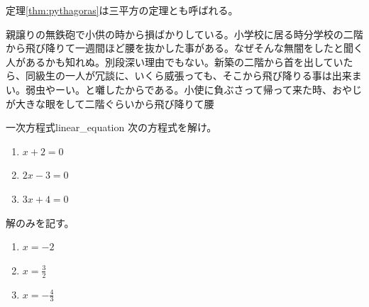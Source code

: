 定理\ref{thm:pythagoras}は三平方の定理とも呼ばれる。

親譲りの無鉄砲で小供の時から損ばかりしている。小学校に居る時分学校の二階から飛び降りて一週間ほど腰を抜かした事がある。なぜそんな無闇をしたと聞く人があるかも知れぬ。別段深い理由でもない。新築の二階から首を出していたら、同級生の一人が冗談に、いくら威張っても、そこから飛び降りる事は出来まい。弱虫やーい。と囃したからである。小使に負ぶさって帰って来た時、おやじが大きな眼をして二階ぐらいから飛び降りて腰

\begin{eg}{一次方程式}{linear_equation}
    次の方程式を解け。
    \begin{enumerate}
        \item \(x + 2 = 0\)
        \item \(2x - 3 = 0\)
        \item \(3x + 4 = 0\)
    \end{enumerate}
    \tcblower
    解のみを記す。
    \begin{enumerate}
        \item \(x = -2\)
        \item \(x = \frac{3}{2}\)
        \item \(x = -\frac{4}{3}\)
    \end{enumerate}
\end{eg}

